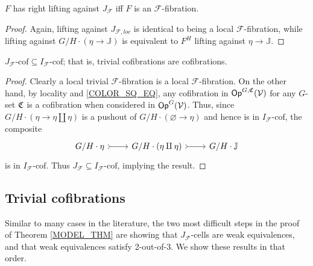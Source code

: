 \documentclass[a4paper,10pt
,draft
]{article}%
\renewcommand{\F}{\mathcal F}
\newcommand{\J}{\mathbb J}
\renewcommand{\1}{\eta}%
\begin{document}
\begin{lemma}
      $F$ has right lifting against $J_{\F}$ iff $F$ is an $\F$-fibration.
\end{lemma}
\begin{proof}
      Again, lifting against $J_{\F, loc}$ is identical to being a local $\F$-fibration, while lifting against $G/H \cdot (\1 \to \J)$
      is equivalent to $F^H$ lifting against $\1 \to \J$.
\end{proof}

\begin{lemma}
      [{cf. \cite[1.19]{CM13b}}]
      \label{POINT_4_LEMMA}
      $J_{\F}\mbox{-cof} \subseteq I_{\F}\mbox{-cof}$; that is, trivial cofibrations are cofibrations.
\end{lemma}
\begin{proof}
      Clearly a local trivial $\F$-fibration is a local $\F$-fibration.
      On the other hand, by locality and \eqref{COLOR_SQ_EQ},
      any cofibration in $\mathsf{Op}^{G, \mathfrak C}(\mathcal V)$ for any $G$-set $\mathfrak C$
      is a cofibration when considered in $\mathsf{Op}^G(\mathcal V)$.
      Thus, since $G/H \cdot (\1 \to \1 \amalg \1)$ is a pushout of $G/H \cdot(\varnothing \to \1)$
      and hence is in $I_{\F}\mbox{-cof}$, the composite
      \begin{equation}
            \begin{tikzcd}
                  G/H \cdot \1 \arrow[r, rightarrowtail]
                  &
                  G/H \cdot (\1 \amalg \1) \arrow[r, rightarrowtail]
                  &
                  G/H \cdot \J 
            \end{tikzcd}
      \end{equation}
      is in $I_{\F}\mbox{-cof}$.
      Thus $J_\F \subseteq I_\F\mbox{-cof}$, implying the result.
\end{proof}

\subsection{Trivial cofibrations}

Similar to many cases in the literature, the two most difficult steps in the proof of Theorem \ref{MODEL_THM} are showing that
$J_\F$-cells are weak equivalences, and that weak equivalences satisfy 2-out-of-3.
We show these results in that order.
\end{document}
